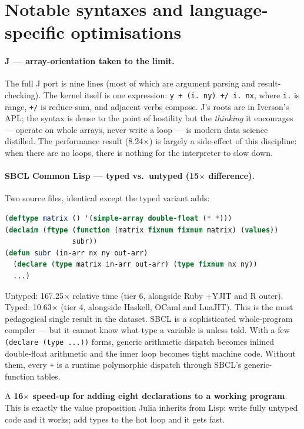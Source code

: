\documentclass[11pt,a4paper]{article}
\begin{document}
\section{Notable syntaxes and language-specific optimisations}
\label{sec:syntax}

\paragraph{J --- array-orientation taken to the limit.}
The full J port is nine lines (most of which are argument parsing
and result-checking). The kernel itself is one expression:
\verb|y + (i. ny) +/ i. nx|, where \verb|i.| is range, \verb|+/|
is reduce-sum, and adjacent verbs compose. J's roots are in
Iverson's APL; the syntax is dense to the point of hostility but the
\emph{thinking} it encourages --- operate on whole arrays, never
write a loop --- is modern data science distilled. The performance
result (8.24$\times$) is largely a side-effect of this discipline:
when there are no loops, there is nothing for the interpreter to
slow down.

\paragraph{SBCL Common Lisp --- typed vs.\ untyped (15$\times$ difference).}
Two source files, identical except the typed variant adds:

\begin{lstlisting}[language=Lisp]
(deftype matrix () '(simple-array double-float (* *)))
(declaim (ftype (function (matrix fixnum fixnum matrix) (values))
                subr))
(defun subr (in-arr nx ny out-arr)
  (declare (type matrix in-arr out-arr) (type fixnum nx ny))
  ...)
\end{lstlisting}

\noindent
Untyped: 167.25$\times$ relative time (tier 6, alongside Ruby +YJIT
and R outer).
Typed: 10.63$\times$ (tier 4, alongside Haskell, OCaml and LuaJIT). This is
the most pedagogical single result in the dataset. SBCL is a
sophisticated whole-program compiler --- but it cannot know what
type a variable is unless told. With a few \verb|(declare (type ...))|
forms, generic arithmetic dispatch becomes inlined double-float
arithmetic and the inner loop becomes tight machine code. Without
them, every \verb|+| is a runtime polymorphic dispatch through SBCL's
generic-function tables.

A \textbf{16$\times$ speed-up for adding eight declarations to a
working program}. This is exactly the value proposition Julia
inherits from Lisp: write fully untyped code and it works; add types
to the hot loop and it gets fast.
\end{document}
